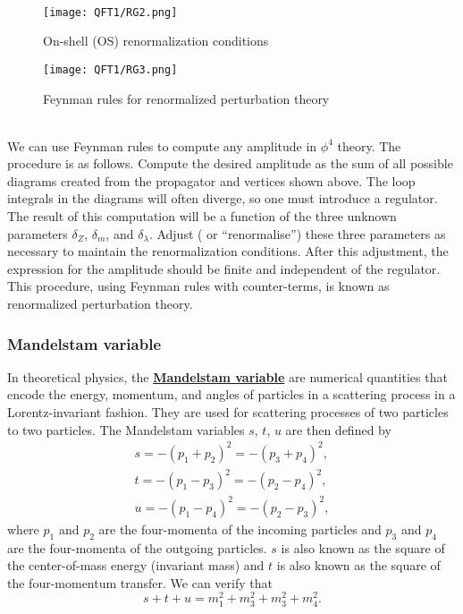 \\
\begin{figure}[!h]
\centering
\texttt{[image: QFT1/RG2.png]}
\caption{On-shell (OS) renormalization conditions}
\end{figure}
\begin{figure}[!h]
\centering
\texttt{[image: QFT1/RG3.png]}
\caption{Feynman rules for renormalized perturbation theory}
\end{figure}
\\
We can use Feynman rules to compute any amplitude in $\phi^4$ theory. The procedure is as follows. Compute the desired amplitude as the sum of all possible diagrams created from the propagator and vertices shown above. The loop integrals in the diagrams will often diverge, so one must introduce a regulator. The result of this computation will be a function of the three unknown parameters $\delta_Z$, $\delta_m$, and $\delta_{\lambda}$. Adjust ( or ``renormalise'') these three parameters as necessary to maintain the renormalization conditions. After this adjustment, the expression for the amplitude should be finite and independent of the regulator.
This procedure, using Feynman rules with counter-terms, is known as renormalized perturbation theory. 

\subsubsection{Mandelstam variable}
In theoretical physics, the \href{https://en.wikipedia.org/wiki/Mandelstam_variables}{\textbf{Mandelstam variable}}  are numerical quantities that encode the energy, momentum, and angles of particles in a scattering process in a Lorentz-invariant fashion. They are used for scattering processes of two particles to two particles. 
The Mandelstam variables $s$, $t$, $u$ are then defined by
\begin{eqnarray}
s=-(p_{1}+p_{2})^{2}=-(p_{3}+p_{4})^{2} ,\nonumber \\
t=-(p_{1}-p_{3})^{2}=-(p_{2}-p_{4})^{2} ,\nonumber \\
u=-(p_{1}-p_{4})^{2}=-(p_{2}-p_{3})^{2} ,\nonumber
\end{eqnarray}
where $p_1$ and $p_2$ are the four-momenta of the incoming particles and $p_3$ and $p_4$ are the four-momenta of the outgoing particles.
$s$ is also known as the square of the center-of-mass energy (invariant mass) and $t$ is also known as the square of the four-momentum transfer.
We can verify that
\[s+t+u = m_1^2 + m_3^2 + m_3^2 +m_4^2.\]

